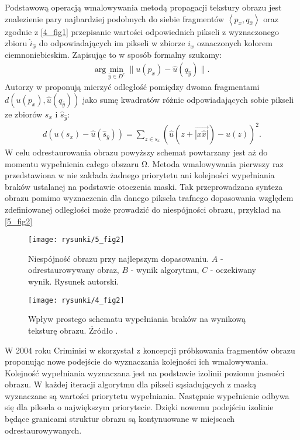 \documentclass[12pt, twoside, openany]{report}
\theoremstyle{definition}
\begin{document}
Podstawową operacją wmalowywania metodą propagacji tekstury obrazu jest znalezienie pary
 najbardziej podobnych do siebie fragmentów $\left\langle p_{x}, q_{\hat{x}} \right\rangle $ oraz zgodnie z \autoref{4_fig1} przepisanie wartości odpowiednich pikseli z wyznaczonego zbioru $\hat{i}_{\hat{x}}$ do odpowiadających im pikseli w zbiorze $i_x$ oznaczonych kolorem ciemnoniebieskim. Zapisując to w sposób formalny szukamy:
\begin{align}
\mathrm{arg} \mathop{\mathrm{min}}_{\hat{y} \in D^c} \big\| u(p_x) - \hat{u} (q_{\hat{y}} ) \big\| .
\label{FROBDIST}
\end{align}
Autorzy w \cite{criminisi2004region} proponują mierzyć odległość pomiędzy dwoma fragmentami $d\left( u(p_x), \hat{u} (q_{\hat{y}}) \right)$ jako sumę kwadratów różnic odpowiadających sobie pikseli ze zbiorów $s_x$ i ${\hat{s}}_{\hat{y}}$:
\begin{align}
d\left( u(s_x) - \hat{u}( \hat{s}_{\hat{y}} )\right)= \sum_{z \in s_x} \left( \hat{u}(z + \overrightarrow{|x \hat{x}|}) - u(z) \right)^2 .
\label{FROBENIUS2} 
\end{align}
W celu odrestaurowania obrazu powyższy schemat powtarzany jest aż do momentu wypełnienia całego obszaru $\mathrm{\Omega }$.
Metoda wmalowywania pierwszy raz przedstawiona w  \cite{efros1999texture} nie zakłada żadnego priorytetu ani kolejności wypełniania braków ustalanej na podstawie otoczenia maski. Tak przeprowadzana synteza obrazu pomimo wyznaczenia dla danego piksela trafnego dopasowania względem zdefiniowanej odległości może prowadzić do niespójności obrazu, przykład na \autoref{5_fig2}
\begin{figure}[!h]
	\centering
	\texttt{[image: rysunki/5\_fig2]}
	\caption{Niespójność obrazu przy najlepszym dopasowaniu. $A$ - odrestaurowywany obraz, $B$ - wynik algorytmu, $C$ - oczekiwany wynik. Rysunek autorski.}
	\label{5_fig2} 
\end{figure}
\begin{figure}[!h]
	\centering
	\texttt{[image: rysunki/4\_fig2]}
	\caption{Wpływ prostego schematu wypełniania braków na wynikową teksturę obrazu. Źródło \cite{criminisi2004region}.}
	\label{4_fig2} 
\end{figure}
W 2004 roku Criminisi w \cite{criminisi2004region} skorzystał z koncepcji próbkowania fragmentów obrazu proponując nowe podejście do wyznaczania kolejności ich wmalowywania.  Kolejność wypełniania wyznaczana jest na podstawie izolinii poziomu jasności obrazu. W każdej iteracji algorytmu dla pikseli sąsiadujących z maską wyznaczane są wartości priorytetu wypełniania. Następnie wypełnienie odbywa się dla piksela o największym priorytecie. Dzięki nowemu podejściu izolinie będące granicami struktur obrazu są kontynuowane w miejscach odrestaurowywanych.
\end{document}
